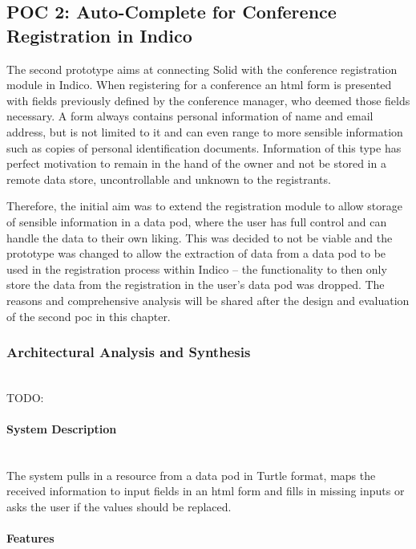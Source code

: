 \subsection{POC 2: Auto-Complete for Conference Registration in Indico}

The second prototype aims at connecting Solid with the conference registration module in Indico. When registering for a conference an \gls{html} form is presented with fields previously defined by the conference manager, who deemed those fields necessary. A form always contains personal information of name and email address, but is not limited to it and can even range to more sensible information such as copies of personal identification documents. Information of this type has perfect motivation to remain in the hand of the owner and not be stored in a remote data store, uncontrollable and unknown to the registrants.

Therefore, the initial aim was to extend the registration module to allow storage of sensible information in a data pod, where the user has full control and can handle the data to their own liking. This was decided to not be viable and the prototype was changed to allow the extraction of data from a data pod to be used in the registration process within Indico -- the functionality to then only store the data from the registration in the user's data pod was dropped. The reasons and comprehensive analysis will be shared after the design and evaluation of the second \gls{poc} in this chapter.

\subsubsection{Architectural Analysis and Synthesis}\mbox{}\\

TODO:
\vspace{0.5cm}
\paragraph{System Description}\mbox{}\\

The system pulls in a resource from a data pod in Turtle format, maps the received information to input fields in an \gls{html} form and fills in missing inputs or asks the user if the values should be replaced.

\vspace{0.5cm}
\paragraph{Features}\mbox{}\\

